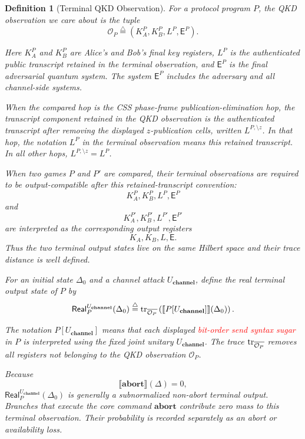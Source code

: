 \documentclass[acmsmall,screen,review,anonymous,nonacm]{acmart}
\newtheorem{definition}{Definition}[section]
\theoremstyle{defn_style}
\newcommand{\sem}[1]{\llbracket #1 \rrbracket}
\newcommand{\tr}{\textup{tr}}
\begin{document}
\begin{definition}[Terminal QKD Observation]

For a protocol program \(P\), the QKD observation we care about is the tuple
\[
\mathcal O_P
\stackrel{\triangle}{=}
(K_A^P,K_B^P,L^P,\mathsf E^P).
\]

Here \(K_A^P\) and \(K_B^P\) are Alice's and Bob's final key registers,
\(L^P\) is the authenticated public transcript retained in the terminal
observation, and \(\mathsf E^P\) is the final adversarial quantum system.
The system \(\mathsf E^P\) includes the adversary and all channel-side systems.

When the compared hop is the CSS phase-frame publication-elimination hop, the
transcript component retained in the QKD observation is the authenticated
transcript after removing the displayed \(z\)-publication cells, written
\(L^{P,\setminus z}\).  In that hop, the notation \(L^P\) in the terminal
observation means this retained transcript.  In all other hops,
\(L^{P,\setminus z}=L^P\).

When two games \(P\) and \(P'\) are compared, their terminal observations are
required to be output-compatible after this retained-transcript convention:
\[
K_A^P,K_B^P,L^P,\mathsf E^P
\]
and
\[
K_A^{P'},K_B^{P'},L^{P'},\mathsf E^{P'}
\]
are interpreted as the corresponding output registers
\[
K_A,K_B,L,\mathsf E .
\]
Thus the two terminal output states live on the same Hilbert space and their
trace distance is well defined.


For an initial state \(\Delta_0\) and a channel attack
\(U_{\textbf{channel}}\), define the real terminal output state of \(P\) by
\[
\mathsf{Real}_{P}^{U_{\textbf{channel}}}(\Delta_0)
\stackrel{\triangle}{=}
\tr_{\overline{\mathcal O_P}}
\left(
\sem{P[U_{\textbf{channel}}]}(\Delta_0)
\right).
\]

The notation \(P[U_{\textbf{channel}}]\) means that each displayed  \textcolor{red}{bit-order send syntax sugar} in \(P\) is interpreted using the fixed joint unitary \(U_{\textbf{channel}}\).  The trace \(\tr_{\overline{\mathcal O_P}}\) removes all registers not belonging to the QKD observation \(\mathcal O_P\).

Because
\[
\sem{\mathbf{abort}}(\Delta)=0,
\]
\(\mathsf{Real}_{P}^{U_{\textbf{channel}}}(\Delta_0)\) is generally a
subnormalized non-abort terminal output.  Branches that execute the core command
\(\mathbf{abort}\) contribute zero mass to this terminal observation.  Their
probability is recorded separately as an abort or availability loss.
\end{definition}
\end{document}
